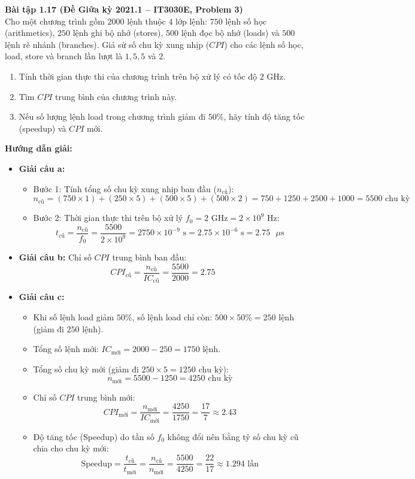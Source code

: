 \textbf{Bài tập 1.17 (Đề Giữa kỳ 2021.1 -- IT3030E, Problem 3)}\\
Cho một chương trình gồm $2000\text{ lệnh}$ thuộc 4 lớp lệnh: $750$ lệnh số học (arithmetics), $250$ lệnh ghi bộ nhớ (stores), $500$ lệnh đọc bộ nhớ (loads) và $500$ lệnh rẽ nhánh (branches). Giả sử số chu kỳ xung nhịp ($CPI$) cho các lệnh số học, load, store và branch lần lượt là $1, 5, 5$ và $2$.
\begin{enumerate}[label=\alph*)]
    \item Tính thời gian thực thi của chương trình trên bộ xử lý có tốc độ $2\text{ GHz}$.
    \item Tìm $CPI$ trung bình của chương trình này.
    \item Nếu số lượng lệnh load trong chương trình giảm đi $50\%$, hãy tính độ tăng tốc (speedup) và $CPI$ mới.
\end{enumerate}
\textbf{Hướng dẫn giải:}
\begin{itemize}
    \item \textbf{Giải câu a:}
    \begin{itemize}
        \item Bước 1: Tính tổng số chu kỳ xung nhịp ban đầu ($n_{\text{cũ}}$):
        $$n_{\text{cũ}} = (750 \times 1) + (250 \times 5) + (500 \times 5) + (500 \times 2) = 750 + 1250 + 2500 + 1000 = 5500\text{ chu kỳ}$$
        \item Bước 2: Thời gian thực thi trên bộ xử lý $f_0 = 2\text{ GHz} = 2 \times 10^9\text{ Hz}$:
        $$t_{\text{cũ}} = \frac{n_{\text{cũ}}}{f_0} = \frac{5500}{2 \times 10^9} = 2750 \times 10^{-9}\text{ s} = 2.75 \times 10^{-6}\text{ s} = 2.75\text{ }\mu\text{s}$$
    \end{itemize}
    \item \textbf{Giải câu b:} Chỉ số $CPI$ trung bình ban đầu:
    $$CPI_{\text{cũ}} = \frac{n_{\text{cũ}}}{IC_{\text{cũ}}} = \frac{5500}{2000} = 2.75$$
    \item \textbf{Giải câu c:}
    \begin{itemize}
        \item Khi số lệnh load giảm $50\%$, số lệnh load chỉ còn: $500 \times 50\% = 250\text{ lệnh}$ (giảm đi $250$ lệnh).
        \item Tổng số lệnh mới: $IC_{\text{mới}} = 2000 - 250 = 1750\text{ lệnh}$.
        \item Tổng số chu kỳ mới (giảm đi $250 \times 5 = 1250\text{ chu kỳ}$):
        $$n_{\text{mới}} = 5500 - 1250 = 4250\text{ chu kỳ}$$
        \item Chỉ số $CPI$ trung bình mới:
        $$CPI_{\text{mới}} = \frac{n_{\text{mới}}}{IC_{\text{mới}}} = \frac{4250}{1750} = \frac{17}{7} \approx 2.43$$
        \item Độ tăng tốc (Speedup) do tần số $f_0$ không đổi nên bằng tỷ số chu kỳ cũ chia cho chu kỳ mới:
        $$\text{Speedup} = \frac{t_{\text{cũ}}}{t_{\text{mới}}} = \frac{n_{\text{cũ}}}{n_{\text{mới}}} = \frac{5500}{4250} = \frac{22}{17} \approx 1.294\text{ lần}$$
    \end{itemize}
\end{itemize}

